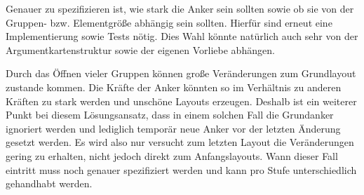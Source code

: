 Genauer zu spezifizieren ist, wie stark die Anker sein sollten sowie ob sie von der Gruppen- bzw. Elementgröße abhängig sein sollten. 
Hierfür sind erneut eine Implementierung sowie Tests nötig. Dies Wahl könnte natürlich auch sehr von der Argumentkartenstruktur sowie der eigenen Vorliebe abhängen.

Durch das Öffnen vieler Gruppen können große Veränderungen zum Grundlayout zustande kommen.
Die Kräfte der Anker könnten so im Verhältnis zu anderen Kräften zu stark werden und unschöne Layouts erzeugen.
Deshalb ist ein weiterer Punkt bei diesem Lösungsansatz, dass in einem solchen Fall die Grundanker ignoriert werden 
und lediglich temporär neue Anker vor der letzten Änderung gesetzt werden. 
Es wird also nur versucht zum letzten Layout die Veränderungen gering zu erhalten, nicht jedoch direkt zum Anfangslayouts. 
Wann dieser Fall eintritt muss noch genauer spezifiziert werden und kann pro Stufe unterschiedlich gehandhabt werden.

